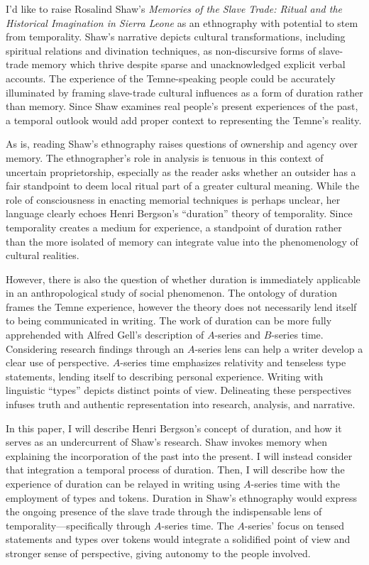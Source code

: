 I'd like to raise Rosalind Shaw's \emph{Memories of the Slave Trade:
Ritual and the Historical Imagination in Sierra Leone} as an ethnography
with potential to stem from temporality. Shaw's narrative depicts
cultural transformations, including spiritual relations and divination
techniques, as non-discursive forms of slave-trade memory which thrive
despite sparse and unacknowledged explicit verbal accounts. The
experience of the Temne-speaking people could be accurately illuminated
by framing slave-trade cultural influences as a form of duration rather
than memory. Since Shaw examines real people's present experiences of
the past, a temporal outlook would add proper context to representing
the Temne's reality.


As is, reading Shaw's ethnography raises questions of ownership and
agency over memory. The ethnographer's role in analysis is tenuous in
this context of uncertain proprietorship, especially as the reader asks
whether an outsider has a fair standpoint to deem local ritual part of a
greater cultural meaning. While the role of consciousness in enacting memorial techniques is perhaps unclear, her language clearly echoes
Henri Bergson's ``duration'' theory of temporality. Since temporality
creates a medium for experience, a standpoint of duration rather than
the more isolated of memory can integrate value into the phenomenology
of cultural realities.

However, there is also the question of whether duration is immediately
applicable in an anthropological study of social phenomenon. The
ontology of duration frames the Temne experience, however the theory
does not necessarily lend itself to being communicated in writing. The
work of duration can be more fully apprehended with Alfred Gell's
description of $A$-series and $B$-series time. Considering research findings
through an $A$-series lens can help a writer develop a clear use of
perspective. $A$-series time emphasizes relativity and tenseless type
statements, lending itself to describing personal experience. Writing
with linguistic ``types'' depicts distinct points of view. Delineating
these perspectives infuses truth and authentic representation into
research, analysis, and narrative.

In this paper, I will describe Henri Bergson's concept of duration, and
how it serves as an undercurrent of Shaw's research. Shaw invokes memory
when explaining the incorporation of the past into the present. I will
instead consider that integration a temporal process of duration. Then,
I will describe how the experience of duration can be relayed in writing
using $A$-series time with the employment of types and tokens. Duration in
Shaw's ethnography would express the ongoing presence of the slave trade
through the indispensable lens of temporality---specifically through
$A$-series time. The $A$-series' focus on tensed statements and types over
tokens would integrate a solidified point of view and stronger sense of
perspective, giving autonomy to the people involved.

